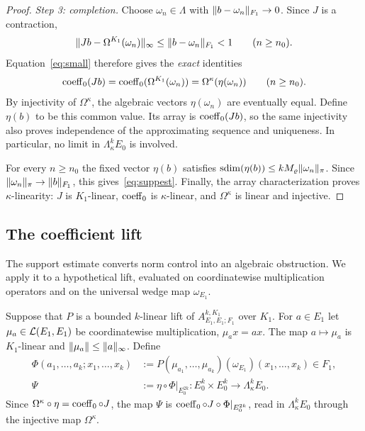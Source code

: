\begin{proof}
\emph{Step 3: completion.} Choose $\omega_n\in\Lambda$ with $\lVert b-\omega_n\rVert_{F_1}\to0$. Since $J$ is a contraction,
\[
\lVert Jb-\Omega^{K_1}(\omega_n)\rVert_\infty\le\lVert b-\omega_n\rVert_{F_1}<1
\qquad(n\ge n_0).
\]
Equation~\eqref{eq:small} therefore gives the \emph{exact} identities
\[
\operatorname{coeff}_0(Jb)=\operatorname{coeff}_0(\Omega^{K_1}(\omega_n))=\Omega^\kappa(\eta(\omega_n))
\qquad(n\ge n_0).
\]
By injectivity of $\Omega^\kappa$, the algebraic vectors $\eta(\omega_n)$ are eventually equal. Define $\eta(b)$
to be this common value. Its array is $\operatorname{coeff}_0(Jb)$, so the same injectivity also proves independence of the
approximating sequence and uniqueness. In particular, no limit in $\Lambda^k_\kappa E_0$ is involved.

For every $n\ge n_0$ the fixed vector $\eta(b)$ satisfies
$\operatorname{sdim}(\eta(b))\le kM_\varrho\lVert \omega_n\rVert_\pi$. Since $\lVert \omega_n\rVert_\pi\to\lVert b\rVert_{F_1}$, this gives~\eqref{eq:suppest}.
Finally, the array characterization proves $\kappa$\nobreakdash-linearity: $J$ is $K_1$\nobreakdash-linear, $\operatorname{coeff}_0$ is
$\kappa$\nobreakdash-linear, and $\Omega^\kappa$ is linear and injective.
\end{proof}

\subsection{The coefficient lift}\label{ssec:Psi}
The support estimate converts norm control into an algebraic obstruction. We apply it to a hypothetical lift,
evaluated on coordinatewise multiplication operators and on the universal wedge map $\omega_{E_1}$.

Suppose that $P$ is a bounded $k$\nobreakdash-linear lift of $A^{k,K_1}_{E_1,E_1;F_1}$ over $K_1$. For $a\in E_1$ let
$\mu_a\in\mathcal L(E_1,E_1)$ be coordinatewise multiplication, $\mu_ax=ax$. The map $a\mapsto \mu_a$ is $K_1$\nobreakdash-linear and
$\lVert \mu_a\rVert\le\lVert a\rVert_\infty$. Define
\begin{align*}
\Phi(a_1,\dots,a_k;x_1,\dots,x_k)&:=P(\mu_{a_1},\dots,\mu_{a_k})(\omega_{E_1})(x_1,\dots,x_k)\in F_1,\\
\Psi&:=\eta\circ\Phi|_{E_0^{2k}}\colon E_0^k\times E_0^k\to\Lambda^k_\kappa E_0 .
\end{align*}
Since $\Omega^\kappa\circ\eta=\operatorname{coeff}_0\circ J$, the map $\Psi$ is $\operatorname{coeff}_0\circ J\circ\Phi|_{E_0^{2k}}$, read in $\Lambda^k_\kappa E_0$
through the injective map $\Omega^\kappa$.

